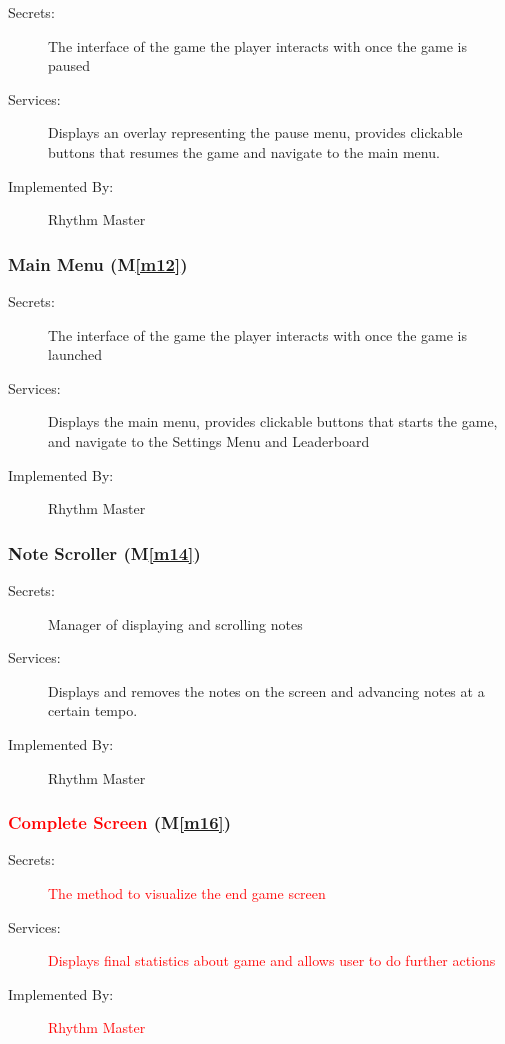 \documentclass[12pt, titlepage]{article}
\newcommand{\mref}[1]{M\ref{#1}}
\begin{document}
\begin{description}
\item[Secrets:] The interface of the game the player interacts with once the game is paused
\item[Services:] Displays an overlay representing the pause menu, provides clickable buttons that resumes the game and navigate to the main menu.
\item[Implemented By:] Rhythm Master
\end{description}

\subsubsection{Main Menu (\mref{m12})}

\begin{description}
\item[Secrets:] The interface of the game the player interacts with once the game is launched
\item[Services:] Displays the main menu, provides clickable buttons that starts the game, and navigate to the Settings Menu and Leaderboard
\item[Implemented By:] Rhythm Master
\end{description}

\subsubsection{Note Scroller (\mref{m14})}

\begin{description}
\item[Secrets:] Manager of displaying and scrolling notes 
\item[Services:] Displays and removes the notes on the screen and advancing notes at a certain tempo.
\item[Implemented By:] Rhythm Master
\end{description}

\subsubsection{\textcolor{red}{Complete Screen} (\mref{m16})}

\begin{description}
\item[Secrets:] \textcolor{red}{The method to visualize the end game screen}
\item[Services:] \textcolor{red}{Displays final statistics about game and allows user to do further actions}
\item[Implemented By:] \textcolor{red}{Rhythm Master}
\end{description}
\end{document}
